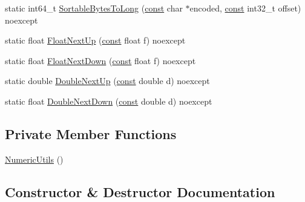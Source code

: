\begin{DoxyCompactItemize}
\item 
static int64\+\_\+t \mbox{\hyperlink{classlucene_1_1core_1_1util_1_1numeric_1_1NumericUtils_a75300b6ffd00df5e169d330471d47e67}{Sortable\+Bytes\+To\+Long}} (\mbox{\hyperlink{ZlibCrc32_8h_a2c212835823e3c54a8ab6d95c652660e}{const}} char $\ast$encoded, \mbox{\hyperlink{ZlibCrc32_8h_a2c212835823e3c54a8ab6d95c652660e}{const}} int32\+\_\+t offset) noexcept
\item 
static float \mbox{\hyperlink{classlucene_1_1core_1_1util_1_1numeric_1_1NumericUtils_ad613ebe1b53d3d3a461a549ed6ab1742}{Float\+Next\+Up}} (\mbox{\hyperlink{ZlibCrc32_8h_a2c212835823e3c54a8ab6d95c652660e}{const}} float f) noexcept
\item 
static float \mbox{\hyperlink{classlucene_1_1core_1_1util_1_1numeric_1_1NumericUtils_ad3cb64d9fdf2f28dbe3ea94e57558ec5}{Float\+Next\+Down}} (\mbox{\hyperlink{ZlibCrc32_8h_a2c212835823e3c54a8ab6d95c652660e}{const}} float f) noexcept
\item 
static double \mbox{\hyperlink{classlucene_1_1core_1_1util_1_1numeric_1_1NumericUtils_af4c894b25b0785ce503dd80adb5c968e}{Double\+Next\+Up}} (\mbox{\hyperlink{ZlibCrc32_8h_a2c212835823e3c54a8ab6d95c652660e}{const}} double d) noexcept
\item 
static float \mbox{\hyperlink{classlucene_1_1core_1_1util_1_1numeric_1_1NumericUtils_a6718491f88ea4f131610e50fb856a95e}{Double\+Next\+Down}} (\mbox{\hyperlink{ZlibCrc32_8h_a2c212835823e3c54a8ab6d95c652660e}{const}} double d) noexcept
\end{DoxyCompactItemize}
\subsection*{Private Member Functions}
\begin{DoxyCompactItemize}
\item 
\mbox{\hyperlink{classlucene_1_1core_1_1util_1_1numeric_1_1NumericUtils_a6d460ab239268d60bfb1a45cd74a64cd}{Numeric\+Utils}} ()
\end{DoxyCompactItemize}


\subsection{Constructor \& Destructor Documentation}
\mbox{\label{classlucene_1_1core_1_1util_1_1numeric_1_1NumericUtils_a6d460ab239268d60bfb1a45cd74a64cd}} 
